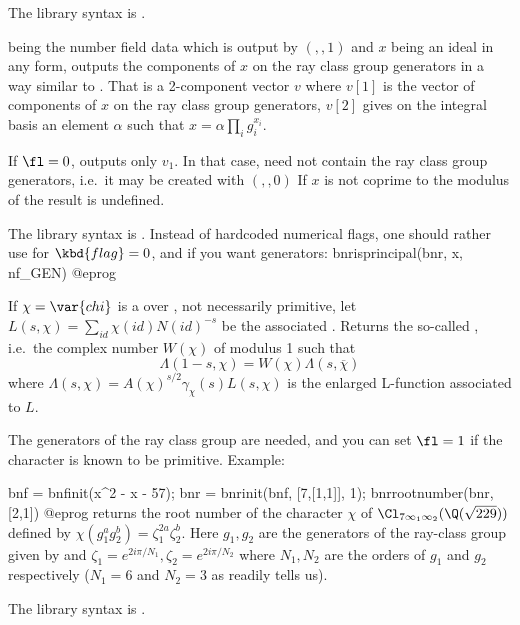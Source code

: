The library syntax is .

\label{se:bnrisprincipal}
 being the
number field data which is output by $(,,1)$ and $x$ being an
ideal in any form, outputs the components of $x$ on the ray class group
generators in a way similar to . That is a 2-component
vector $v$ where $v[1]$ is the vector of components of $x$ on the ray class
group generators, $v[2]$ gives on the integral basis an element $\alpha$ such
that $x=\alpha\prod_ig_i^{x_i}$.

If $\fl=0$, outputs only $v_1$. In that case,  need not contain the
ray class group generators, i.e.~it may be created with $(,,0)$
If $x$ is not coprime to the modulus of  the result is undefined.

The library syntax is .
Instead of hardcoded  numerical flags,  one should rather
use
 for $\kbd{flag} = 0$, and if you
want generators:
\bprog
  bnrisprincipal(bnr, x, nf_GEN)
@eprog

\label{se:bnrrootnumber}
If $\chi=\var{chi}$ is a
 over , not necessarily primitive, let
$L(s,\chi) = \sum_{id} \chi(id) N(id)^{-s}$ be the associated
. Returns the so-called , i.e.~the
complex number $W(\chi)$ of modulus 1 such that
%
$$\Lambda(1-s,\chi) = W(\chi) \Lambda(s,\overline{\chi})$$
%
\noindent where $\Lambda(s,\chi) = A(\chi)^{s/2}\gamma_\chi(s) L(s,\chi)$ is
the enlarged L-function associated to $L$.

The generators of the ray class group are needed, and you can set $\fl=1$ if
the character is known to be primitive. Example:

\bprog
bnf = bnfinit(x^2 - x - 57);
bnr = bnrinit(bnf, [7,[1,1]], 1);
bnrrootnumber(bnr, [2,1])
@eprog\noindent
returns the root number of the character $\chi$ of
$\Cl_{7\infty_1\infty_2}(\Q(\sqrt{229}))$ defined by $\chi(g_1^ag_2^b)
= \zeta_1^{2a}\zeta_2^b$. Here $g_1, g_2$ are the generators of the
ray-class group given by  and $\zeta_1 = e^{2i\pi/N_1},
\zeta_2 = e^{2i\pi/N_2}$ where $N_1, N_2$ are the orders of $g_1$ and
$g_2$ respectively ($N_1=6$ and $N_2=3$ as  readily tells us).

The library syntax is .

